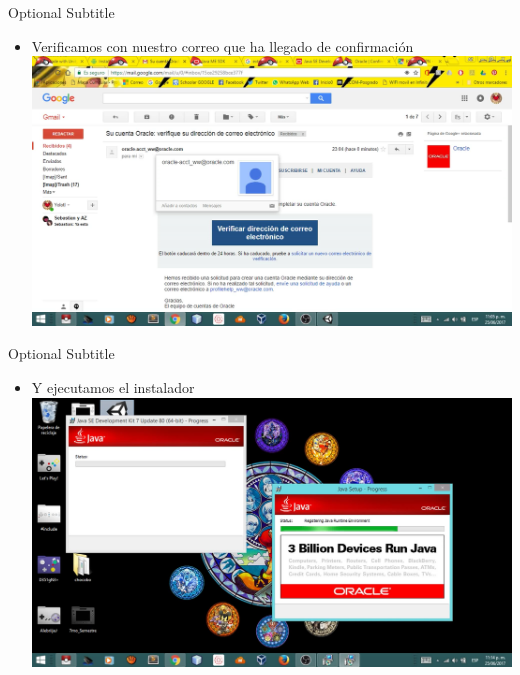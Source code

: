 \documentclass{beamer}
\begin{document}
\begin{frame}{24}{Optional Subtitle}
  \begin{itemize}
  \item {
    Verificamos con nuestro correo que ha llegado de confirmación
  }
  \includegraphics[width=\linewidth]{image/IU24}
  \end{itemize}
\end{frame}

\begin{frame}{25}{Optional Subtitle}
  \begin{itemize}
  \item {
    Y ejecutamos el instalador
  }
  \includegraphics[width=\linewidth]{image/IU25}
  \end{itemize}
\end{frame}

\end{document}

